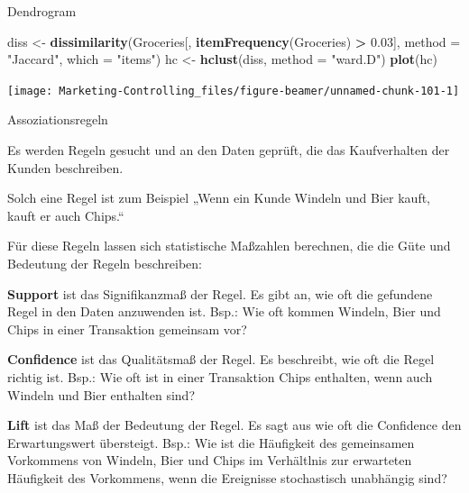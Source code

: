 \documentclass[12pt,ngerman,a4paper,ignorenonframetext,]{beamer}
\newenvironment{Shaded}{\begin{snugshade}}{\end{snugshade}}
\newcommand{\DataTypeTok}[1]{\textcolor[rgb]{0.13,0.29,0.53}{#1}}
\newcommand{\FloatTok}[1]{\textcolor[rgb]{0.00,0.00,0.81}{#1}}
\newcommand{\KeywordTok}[1]{\textcolor[rgb]{0.13,0.29,0.53}{\textbf{#1}}}
\newcommand{\NormalTok}[1]{#1}
\newcommand{\OperatorTok}[1]{\textcolor[rgb]{0.81,0.36,0.00}{\textbf{#1}}}
\newcommand{\StringTok}[1]{\textcolor[rgb]{0.31,0.60,0.02}{#1}}
\begin{document}
\begin{frame}{Dendrogram}
\protect\hypertarget{dendrogram}{}

\begin{Shaded}
\begin{Highlighting}[]
\NormalTok{diss <-}\StringTok{ }\KeywordTok{dissimilarity}\NormalTok{(Groceries[, }\KeywordTok{itemFrequency}\NormalTok{(Groceries) }\OperatorTok{>}\StringTok{ }\FloatTok{0.03}\NormalTok{],}
\DataTypeTok{method =} \StringTok{"Jaccard"}\NormalTok{, }\DataTypeTok{which =} \StringTok{"items"}\NormalTok{) }
\NormalTok{hc <-}\StringTok{ }\KeywordTok{hclust}\NormalTok{(diss, }\DataTypeTok{method =} \StringTok{"ward.D"}\NormalTok{)}
\KeywordTok{plot}\NormalTok{(hc)}
\end{Highlighting}
\end{Shaded}

\begin{center}\texttt{[image: Marketing-Controlling\_files/figure-beamer/unnamed-chunk-101-1]} \end{center}

\end{frame}

\begin{frame}[shrink]{Assoziationsregeln}
\protect\hypertarget{assoziationsregeln}{}

Es werden Regeln gesucht und an den Daten geprüft, die das Kaufverhalten
der Kunden beschreiben.

Solch eine Regel ist zum Beispiel „Wenn ein Kunde Windeln und Bier
kauft, kauft er auch Chips.``

Für diese Regeln lassen sich statistische Maßzahlen berechnen, die die
Güte und Bedeutung der Regeln beschreiben:

\textbf{Support} ist das Signifikanzmaß der Regel. Es gibt an, wie oft
die gefundene Regel in den Daten anzuwenden ist. Bsp.: Wie oft kommen
Windeln, Bier und Chips in einer Transaktion gemeinsam vor?

\textbf{Confidence} ist das Qualitätsmaß der Regel. Es beschreibt, wie
oft die Regel richtig ist. Bsp.: Wie oft ist in einer Transaktion Chips
enthalten, wenn auch Windeln und Bier enthalten sind?

\textbf{Lift} ist das Maß der Bedeutung der Regel. Es sagt aus wie oft
die Confidence den Erwartungswert übersteigt. Bsp.: Wie ist die
Häufigkeit des gemeinsamen Vorkommens von Windeln, Bier und Chips im
Verhältlnis zur erwarteten Häufigkeit des Vorkommens, wenn die
Ereignisse stochastisch unabhängig sind?

\end{frame}
\end{document}
